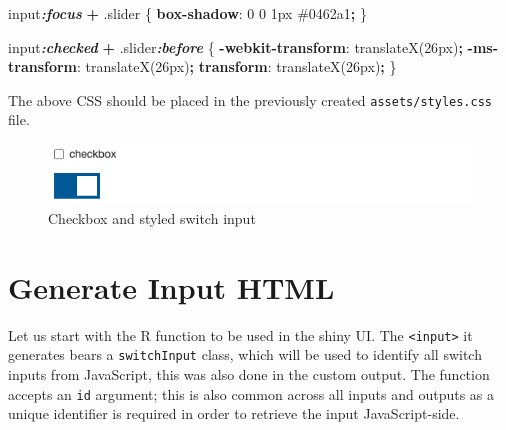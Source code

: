 \documentclass[
  10pt,
]{krantz}
\makeatletter
\newenvironment{Shaded}{\begin{snugshade}}{\end{snugshade}}
\newcommand{\CommentTok}[1]{\textcolor[rgb]{0.37,0.37,0.37}{\textit{#1}}}
\newcommand{\ConstantTok}[1]{\textcolor[rgb]{0,0,0}{#1}}
\newcommand{\ControlFlowTok}[1]{\textcolor[rgb]{0.27,0.27,0.27}{\textbf{#1}}}
\newcommand{\DataTypeTok}[1]{\textcolor[rgb]{0.27,0.27,0.27}{#1}}
\newcommand{\DecValTok}[1]{\textcolor[rgb]{0.06,0.06,0.06}{#1}}
\newcommand{\FunctionTok}[1]{\textcolor[rgb]{0,0,0}{#1}}
\newcommand{\InformationTok}[1]{\textcolor[rgb]{0.37,0.37,0.37}{\textbf{\textit{#1}}}}
\newcommand{\KeywordTok}[1]{\textcolor[rgb]{0.27,0.27,0.27}{\textbf{#1}}}
\newcommand{\NormalTok}[1]{#1}
\newcommand{\OperatorTok}[1]{\textcolor[rgb]{0.43,0.43,0.43}{\textbf{#1}}}
\newcommand{\StringTok}[1]{\textcolor[rgb]{0.5,0.5,0.5}{#1}}
\newenvironment{kframe}{%
\medskip{}
\setlength{\fboxsep}{.8em}
 \def\at@end@of@kframe{}%
 \ifinner\ifhmode%
  \def\at@end@of@kframe{\end{minipage}}%
  \begin{minipage}{\columnwidth}%
 \fi\fi%
 \def\FrameCommand##1{\hskip\@totalleftmargin \hskip-\fboxsep
 \colorbox{shadecolor}{##1}\hskip-\fboxsep
     \hskip-\linewidth \hskip-\@totalleftmargin \hskip\columnwidth}%
 \MakeFramed {\advance\hsize-\width
   \@totalleftmargin\z@ \linewidth\hsize
   \@setminipage}}%
 {\par\unskip\endMakeFramed%
 \at@end@of@kframe}
\renewenvironment{Shaded}{\begin{kframe}}{\end{kframe}}
\makeatother
\begin{document}
\begin{Shaded}
\begin{Highlighting}[]
\NormalTok{input}\InformationTok{:focus} \OperatorTok{+} \FunctionTok{.slider}\NormalTok{ \{}
  \KeywordTok{box{-}shadow}\NormalTok{: }\DecValTok{0} \DecValTok{0} \DecValTok{1}\DataTypeTok{px} \ConstantTok{\#0462a1}\OperatorTok{;}
\NormalTok{\}}

\NormalTok{input}\InformationTok{:checked} \OperatorTok{+} \FunctionTok{.slider}\InformationTok{:before}\NormalTok{ \{}
  \KeywordTok{{-}webkit{-}transform}\NormalTok{: translateX(}\DecValTok{26}\DataTypeTok{px}\NormalTok{)}\OperatorTok{;}
  \KeywordTok{{-}ms{-}transform}\NormalTok{: translateX(}\DecValTok{26}\DataTypeTok{px}\NormalTok{)}\OperatorTok{;}
  \KeywordTok{transform}\NormalTok{: translateX(}\DecValTok{26}\DataTypeTok{px}\NormalTok{)}\OperatorTok{;}
\NormalTok{\}}
\end{Highlighting}
\end{Shaded}

The above CSS should be placed in the previously created \texttt{assets/styles.css} file.

\begin{figure}[H]

{\centering \includegraphics[width=1\linewidth]{images/checkbox-switch} 

}

\caption{Checkbox and styled switch input}\label{fig:checkbox-switch}
\end{figure}

\hypertarget{shiny-input-html}{%
\section{Generate Input HTML}\label{shiny-input-html}}

Let us start with the R function to be used in the shiny UI. The \texttt{\textless{}input\textgreater{}} it generates bears a \texttt{switchInput} class, which will be used to identify all switch inputs from JavaScript, this was also done in the custom output. The function accepts an \texttt{id} argument; this is also common across all inputs and outputs as a unique identifier is required in order to retrieve the input JavaScript-side.

\begin{Shaded}
\end{Shaded}
\end{document}
